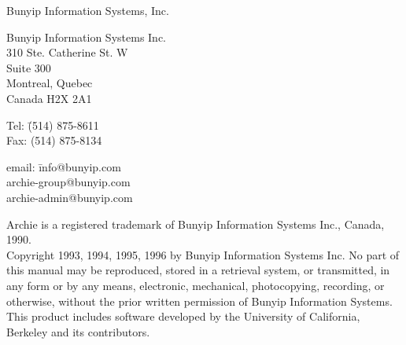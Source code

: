 %
%
%
%








\begin{titlepage}



\vspace*{\fill}

\hfill{\Large Bunyip Information Systems, Inc.} 

\end{titlepage}

\newpage

\thispagestyle{empty}
\vspace*{\fill}

\small{
\noindent Bunyip Information Systems Inc. \\
310 Ste. Catherine St. W \\
Suite 300 \\
Montreal, Quebec \\
Canada H2X 2A1 \\

\begin{tabbing}
Tel: \hspace*{5pt}\=(514) 875-8611 \\
Fax: 	            \>(514) 875-8134 \\
\end{tabbing}


\begin{tabbing}
email: \= info@bunyip.com \\
       \>	archie-group@bunyip.com \\
	     \> archie-admin@bunyip.com \\
\end{tabbing}


\noindent
Archie is a registered trademark of Bunyip Information Systems Inc., Canada,
1990.\\
Copyright  1993, 1994, 1995, 1996 by Bunyip Information Systems Inc.
No part of this manual may be reproduced, stored in a retrieval system, or
transmitted, in any form or by any means, electronic, mechanical,
photocopying, recording, or otherwise, without the prior written permission
of Bunyip Information Systems. \\
This product includes software developed by the University of California,
Berkeley and its contributors.
}
